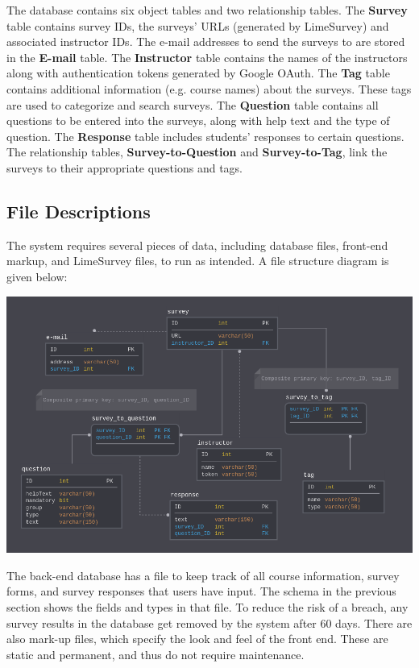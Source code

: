 \documentclass{article}
\begin{document}
\vspace{5mm}

The database contains six object tables and two relationship tables. The \textbf{Survey} table contains survey IDs, the surveys' URLs (generated by LimeSurvey) and associated instructor IDs. The e-mail addresses to send the surveys to are stored in the \textbf{E-mail} table. The \textbf{Instructor} table contains the names of the instructors along with authentication tokens generated by Google OAuth. The \textbf{Tag} table contains additional information (e.g. course names) about the surveys. These tags are used to categorize and search surveys. The \textbf{Question} table contains all questions to be entered into the surveys, along with help text and the type of question. The \textbf{Response} table includes students' responses to certain questions. The relationship tables, \textbf{Survey-to-Question} and \textbf{Survey-to-Tag}, link the surveys to their appropriate questions and tags.

\subsection{File Descriptions}

The system requires several pieces of data, including database files, front-end markup, and LimeSurvey files, to run as intended. A file structure diagram is given below:

\begin{center}
\label{fig:filediagram}
{\includegraphics[scale=.6]{images/schema_diagram.png}} 
\end{center}

The back-end database has a file to keep track of all course information, survey forms, and survey responses that users have input. The schema in the previous section shows the fields and types in that file. To reduce the risk of a breach, any survey results in the database get removed by the system after 60 days. There are also mark-up files, which specify the look and feel of the front end. These are static and permanent, and thus do not require maintenance.
\end{document}
